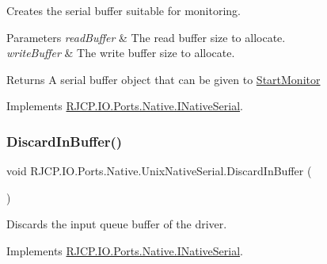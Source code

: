 Creates the serial buffer suitable for monitoring. 


\begin{DoxyParams}{Parameters}
{\em read\+Buffer} & The read buffer size to allocate.\\
\hline
{\em write\+Buffer} & The write buffer size to allocate.\\
\hline
\end{DoxyParams}
\begin{DoxyReturn}{Returns}
A serial buffer object that can be given to \mbox{\hyperlink{class_r_j_c_p_1_1_i_o_1_1_ports_1_1_native_1_1_unix_native_serial_a1dff48491b2421e1310acdab46d80fbb}{Start\+Monitor}}
\end{DoxyReturn}


Implements \mbox{\hyperlink{interface_r_j_c_p_1_1_i_o_1_1_ports_1_1_native_1_1_i_native_serial_a15155443dbfd8aead3cc4ade53b1fa2b}{R\+J\+C\+P.\+I\+O.\+Ports.\+Native.\+I\+Native\+Serial}}.

\mbox{\label{class_r_j_c_p_1_1_i_o_1_1_ports_1_1_native_1_1_unix_native_serial_ad628c35942e258da066b0c488c3cc4ef}} 
\subsubsection{\texorpdfstring{DiscardInBuffer()}{DiscardInBuffer()}}
{\footnotesize\ttfamily void R\+J\+C\+P.\+I\+O.\+Ports.\+Native.\+Unix\+Native\+Serial.\+Discard\+In\+Buffer (\begin{DoxyParamCaption}{ }\end{DoxyParamCaption})}



Discards the input queue buffer of the driver. 



Implements \mbox{\hyperlink{interface_r_j_c_p_1_1_i_o_1_1_ports_1_1_native_1_1_i_native_serial_a686c3cba30f5d5f706d7d3260c4feea5}{R\+J\+C\+P.\+I\+O.\+Ports.\+Native.\+I\+Native\+Serial}}.

\mbox{\label{class_r_j_c_p_1_1_i_o_1_1_ports_1_1_native_1_1_unix_native_serial_a33dccc835ff4a270b598dcadfc7156b0}} 
